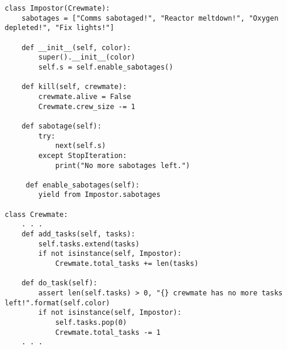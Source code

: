 \begin{solution}
\begin{lstlisting}
class Impostor(Crewmate):
    sabotages = ["Comms sabotaged!", "Reactor meltdown!", "Oxygen depleted!", "Fix lights!"]
    
    def __init__(self, color):
        super().__init__(color)
        self.s = self.enable_sabotages()
    
    def kill(self, crewmate):
        crewmate.alive = False
        Crewmate.crew_size -= 1
    
    def sabotage(self):
        try:
            next(self.s)
        except StopIteration:
            print("No more sabotages left.")
     
     def enable_sabotages(self):
     	yield from Impostor.sabotages

class Crewmate:
    . . .
    def add_tasks(self, tasks):
        self.tasks.extend(tasks)
        if not isinstance(self, Impostor):
            Crewmate.total_tasks += len(tasks)
    
    def do_task(self):
        assert len(self.tasks) > 0, "{} crewmate has no more tasks left!".format(self.color)
        if not isinstance(self, Impostor):
            self.tasks.pop(0)
            Crewmate.total_tasks -= 1
    . . .
\end{lstlisting}
\end{solution}

